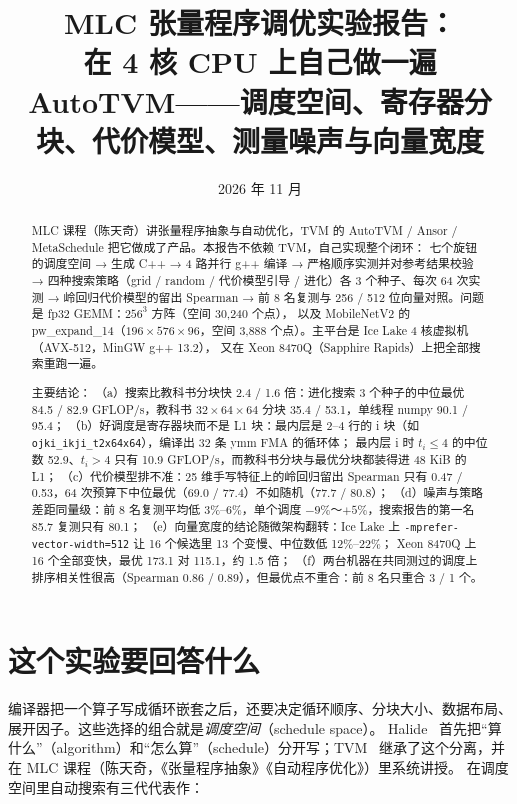 \documentclass[11pt,a4paper]{ctexart}
\title{MLC 张量程序调优实验报告：\\在 4 核 CPU 上自己做一遍 AutoTVM——调度空间、寄存器分块、代价模型、测量噪声与向量宽度}
\author{\authorline}
\date{2026 年 11 月}
\newcommand{\sk}[1]{\texttt{#1}}
\begin{document}
\maketitle

\begin{abstract}
MLC 课程（陈天奇）讲张量程序抽象与自动优化，TVM 的 AutoTVM / Ansor / MetaSchedule 把它做成了产品。本报告不依赖 TVM，自己实现整个闭环：
七个旋钮的调度空间 → 生成 C++ → 4 路并行 g++ 编译 → 严格顺序实测并对参考结果校验 → 四种搜索策略（grid / random / 代价模型引导 / 进化）各 3 个种子、每次 64 次实测
→ 岭回归代价模型的留出 Spearman → 前 8 名复测与 256 / 512 位向量对照。问题是 fp32 GEMM：$256^3$ 方阵（空间 30,240 个点），
以及 MobileNetV2 的 pw\_expand\_14（$196\times576\times96$，空间 3,888 个点）。主平台是 Ice Lake 4 核虚拟机（AVX-512，MinGW g++ 13.2），
又在 Xeon 8470Q（Sapphire Rapids）上把全部搜索重跑一遍。

主要结论：
（a）搜索比教科书分块快 2.4 / 1.6 倍：进化搜索 3 个种子的中位最优 84.5 / 82.9 GFLOP/s，教科书 $32\times64\times64$ 分块 35.4 / 53.1，单线程 numpy 90.1 / 95.4；
（b）好调度是寄存器块而不是 L1 块：最内层是 2--4 行的 i 块（如 \sk{ojki\_ikji\_t2x64x64}），编译出 32 条 ymm FMA 的循环体；
最内层 i 时 $t_i\le4$ 的中位数 52.9、$t_i>4$ 只有 10.9 GFLOP/s，而教科书分块与最优分块都装得进 48 KiB 的 L1；
（c）代价模型排不准：25 维手写特征上的岭回归留出 Spearman 只有 0.47 / 0.53，64 次预算下中位最优（69.0 / 77.4）不如随机（77.7 / 80.8）；
（d）噪声与策略差距同量级：前 8 名复测平均低 3\%--6\%，单个调度 $-9\%$～$+5\%$，搜索报告的第一名 85.7 复测只有 80.1；
（e）向量宽度的结论随微架构翻转：Ice Lake 上 \texttt{-mprefer-vector-width=512} 让 16 个候选里 13 个变慢、中位数低 12\%--22\%；
Xeon 8470Q 上 16 个全部变快，最优 173.1 对 115.1，约 1.5 倍；
（f）两台机器在共同测过的调度上排序相关性很高（Spearman 0.86 / 0.89），但最优点不重合：前 8 名只重合 3 / 1 个。
\end{abstract}

\tableofcontents
\newpage

\section{这个实验要回答什么}

编译器把一个算子写成循环嵌套之后，还要决定循环顺序、分块大小、数据布局、展开因子。这些选择的组合就是\emph{调度空间}（schedule space）。
Halide~\cite{halide} 首先把“算什么”（algorithm）和“怎么算”（schedule）分开写；TVM~\cite{tvm} 继承了这个分离，并在 MLC 课程（陈天奇，《张量程序抽象》《自动程序优化》）里系统讲授。
在调度空间里自动搜索有三代代表作：
\end{document}
